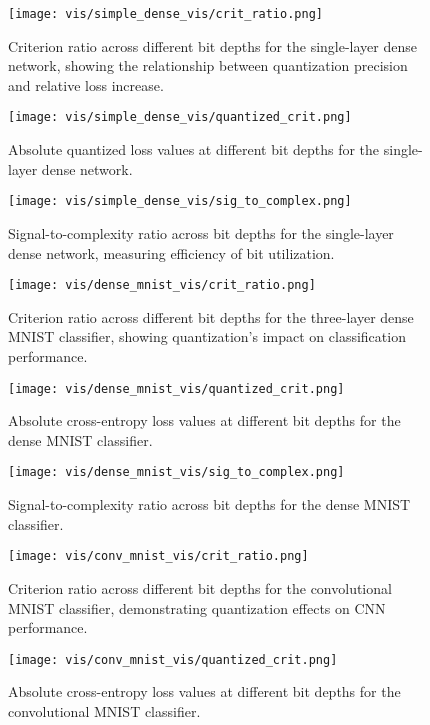 \documentclass[twocolumn]{article}
\begin{document}
\label{appendix:figures}
\begin{figure}[htbp]
\centering
\texttt{[image: vis/simple\_dense\_vis/crit\_ratio.png]}
\caption{Criterion ratio across different bit depths for the single-layer dense network, showing the relationship between quantization precision and relative loss increase.}
\label{fig:simple_dense_cr}
\end{figure}
\begin{figure}[htbp]
\centering
\texttt{[image: vis/simple\_dense\_vis/quantized\_crit.png]}
\caption{Absolute quantized loss values at different bit depths for the single-layer dense network.}
\label{fig:simple_dense_qc}
\end{figure}
\begin{figure}[htbp]
\centering
\texttt{[image: vis/simple\_dense\_vis/sig\_to\_complex.png]}
\caption{Signal-to-complexity ratio across bit depths for the single-layer dense network, measuring efficiency of bit utilization.}
\label{fig:simple_dense_scr}
\end{figure}
\begin{figure}[htbp]
\centering
\texttt{[image: vis/dense\_mnist\_vis/crit\_ratio.png]}
\caption{Criterion ratio across different bit depths for the three-layer dense MNIST classifier, showing quantization's impact on classification performance.}
\label{fig:dense_mnist_cr}
\end{figure}
\begin{figure}[htbp]
\centering
\texttt{[image: vis/dense\_mnist\_vis/quantized\_crit.png]}
\caption{Absolute cross-entropy loss values at different bit depths for the dense MNIST classifier.}
\label{fig:dense_mnist_qc}
\end{figure}
\begin{figure}[htbp]
\centering
\texttt{[image: vis/dense\_mnist\_vis/sig\_to\_complex.png]}
\caption{Signal-to-complexity ratio across bit depths for the dense MNIST classifier.}
\label{fig:dense_mnist_scr}
\end{figure}
\begin{figure}[htbp]
\centering
\texttt{[image: vis/conv\_mnist\_vis/crit\_ratio.png]}
\caption{Criterion ratio across different bit depths for the convolutional MNIST classifier, demonstrating quantization effects on CNN performance.}
\label{fig:conv_mnist_cr}
\end{figure}
\begin{figure}[htbp]
\centering
\texttt{[image: vis/conv\_mnist\_vis/quantized\_crit.png]}
\caption{Absolute cross-entropy loss values at different bit depths for the convolutional MNIST classifier.}
\label{fig:conv_mnist_qc}
\end{figure}
\end{document}

